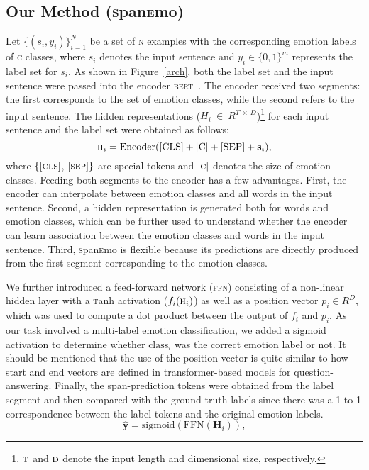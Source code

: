 \documentclass[11pt,a4paper]{article}
\begin{document}
\subsection{Our Method (\textsc{s}pan\textsc{e}mo)}
Let $\{(s_{i}, y_{i})\}_{i=1}^{N}$ be a set of \textsc{n} examples with the corresponding emotion labels of \textsc{c} classes, where $s_{i}$ denotes the input sentence and $y_{i} \in \{0,1\}^{m}$ represents the label set for $s_{i}$. As shown in Figure~\ref{arch}, both the label set and the input sentence were passed into the encoder \textsc{bert}~\cite{devlin2019bert}. The encoder received two segments: the first corresponds to the set of emotion classes, while the second refers to the input sentence. The hidden representations ($H_{i}~\in~R^{T~\times~D}$)\footnote{$\textsc{t}$ and $\textsc{d}$ denote the input length and dimensional size, respectively.} for each input sentence and the label set were obtained as follows:\begin{equation}
    \textsc{h}_{i} = \text{Encoder}(\mathrm{[CLS]} + \mathrm{|C|} + \mathrm{[SEP]} + \mathbf{s}_{i}),
\end{equation}
where $\{[\textsc{cls}]$, $[\textsc{sep}]\}$ are special tokens and $|\textsc{c}|$ denotes the size of emotion classes. Feeding both segments to the encoder has a few advantages. First, the encoder can interpolate between emotion classes and all words in the input sentence. Second, a hidden representation is generated both for words and emotion classes, which can be further used to understand whether the encoder can learn association between the emotion classes and words in the input sentence. Third, \textsc{s}pan\textsc{e}mo is flexible because its predictions are directly produced from the first segment corresponding to the emotion classes.

We further introduced a feed-forward network (\textsc{ffn}) consisting of a non-linear hidden layer with a \textsc{t}anh activation ($f_{i}(\textsc{h}_{i})$) as well as a position vector $p_{i} \in R^{D}$, which was used to compute a dot product between the output of $f_{i}$ and $p_{i}$. As our task involved a multi-label emotion classification, we added a sigmoid activation to determine whether $\text{class}_{i}$ was the correct emotion label or not. It should be mentioned that the use of the position vector is quite similar to how start and end vectors are defined in transformer-based models for question-answering. Finally, the span-prediction tokens were obtained from the label segment and then compared with the ground truth labels since there was a 1-to-1 correspondence between the label tokens and the original emotion labels.
\begin{equation}
    \mathbf{\hat{y}} = \mathrm{sigmoid}(\text{FFN}(\mathbf{H}_{i})),
\end{equation}
\end{document}
